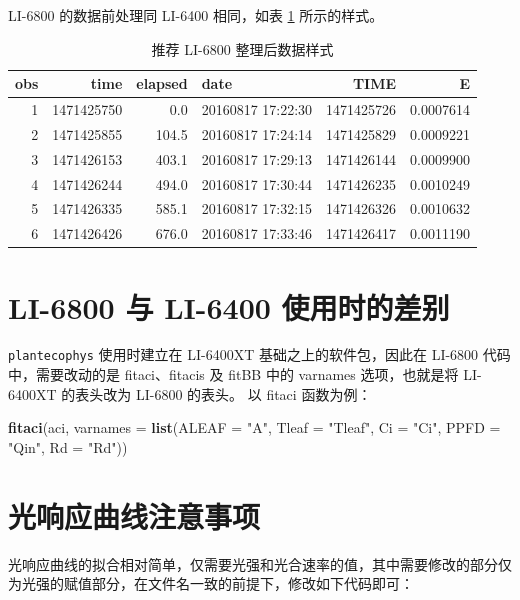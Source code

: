 \documentclass[]{krantz}
\makeatletter
\newenvironment{Shaded}{\begin{snugshade}}{\end{snugshade}}
\newcommand{\KeywordTok}[1]{\textcolor[rgb]{0.13,0.29,0.53}{\textbf{#1}}}
\newcommand{\DataTypeTok}[1]{\textcolor[rgb]{0.13,0.29,0.53}{#1}}
\newcommand{\StringTok}[1]{\textcolor[rgb]{0.31,0.60,0.02}{#1}}
\newcommand{\NormalTok}[1]{#1}
\newenvironment{kframe}{%
\medskip{}
\setlength{\fboxsep}{.8em}
 \def\at@end@of@kframe{}%
 \ifinner\ifhmode%
  \def\at@end@of@kframe{\end{minipage}}%
  \begin{minipage}{\columnwidth}%
 \fi\fi%
 \def\FrameCommand##1{\hskip\@totalleftmargin \hskip-\fboxsep
 \colorbox{shadecolor}{##1}\hskip-\fboxsep
     \hskip-\linewidth \hskip-\@totalleftmargin \hskip\columnwidth}%
 \MakeFramed {\advance\hsize-\width
   \@totalleftmargin\z@ \linewidth\hsize
   \@setminipage}}%
 {\par\unskip\endMakeFramed%
 \at@end@of@kframe}
\renewenvironment{Shaded}{\begin{kframe}}{\end{kframe}}
\theoremstyle{definition}
\theoremstyle{definition}
\theoremstyle{definition}
\theoremstyle{remark}
\makeatother
\begin{document}
LI-6800 的数据前处理同 LI-6400 相同，如表 \ref{tab:head6800}
所示的样式。

\begin{longtable}[t]{rrrlrr}
\caption{\label{tab:head6800}推荐 LI-6800 整理后数据样式}\\
\toprule
obs & time & elapsed & date & TIME & E\\
\midrule
1 & 1471425750 & 0.0 & 20160817 17:22:30 & 1471425726 & 0.0007614\\
2 & 1471425855 & 104.5 & 20160817 17:24:14 & 1471425829 & 0.0009221\\
3 & 1471426153 & 403.1 & 20160817 17:29:13 & 1471426144 & 0.0009900\\
4 & 1471426244 & 494.0 & 20160817 17:30:44 & 1471426235 & 0.0010249\\
5 & 1471426335 & 585.1 & 20160817 17:32:15 & 1471426326 & 0.0010632\\
6 & 1471426426 & 676.0 & 20160817 17:33:46 & 1471426417 & 0.0011190\\
\bottomrule
\end{longtable}

\section{LI-6800 与 LI-6400 使用时的差别}\label{dif}

\texttt{plantecophys} 使用时建立在 LI-6400XT 基础之上的软件包，因此在
LI-6800 代码中，需要改动的是 fitaci、fitacis 及 fitBB 中的 varnames
选项，也就是将 LI-6400XT 的表头改为 LI-6800 的表头。 以 fitaci
函数为例：

\begin{Shaded}
\begin{Highlighting}[]
 \KeywordTok{fitaci}\NormalTok{(aci, }\DataTypeTok{varnames =} 
        \KeywordTok{list}\NormalTok{(}\DataTypeTok{ALEAF =} \StringTok{"A"}\NormalTok{, }\DataTypeTok{Tleaf =} \StringTok{"Tleaf"}\NormalTok{, }\DataTypeTok{Ci =} \StringTok{"Ci"}\NormalTok{, }
          \DataTypeTok{PPFD  =} \StringTok{"Qin"}\NormalTok{, }\DataTypeTok{Rd =} \StringTok{"Rd"}\NormalTok{))}
\end{Highlighting}
\end{Shaded}

\section{光响应曲线注意事项}\label{notice}

光响应曲线的拟合相对简单，仅需要光强和光合速率的值，其中需要修改的部分仅为光强的赋值部分，在文件名一致的前提下，修改如下代码即可：
\end{document}
